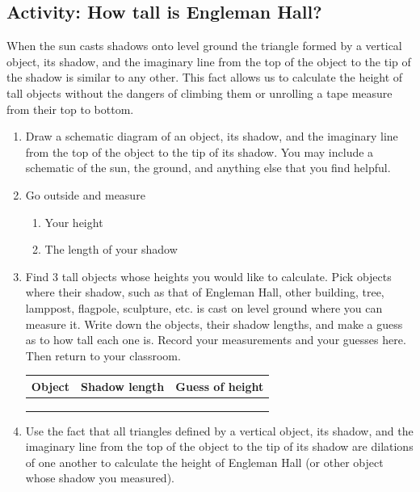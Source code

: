 \wbnewpage
\subsection{Activity: How tall is Engleman Hall?}
When the sun casts shadows onto level ground the triangle formed by a vertical object, its shadow, and the imaginary line from the top of the object to the tip of the shadow is similar to any other. This fact allows us to calculate the height of tall objects without the dangers of climbing them or unrolling a tape measure from their top to bottom.
\begin{enumerate}
    \item Draw a schematic diagram of an object, its shadow, and the imaginary line from the top of the object to the tip of its shadow. You may include a schematic of the sun, the ground, and anything else that you find helpful.\wbvfill\wbvfill
    \item Go outside and measure 
    \begin{enumerate}
        \item Your height\medskip
        \item The length of your shadow\medskip
    \end{enumerate}
    \item Find 3 tall objects whose heights you would like to calculate. Pick objects where their shadow, such as that of Engleman Hall, other building, tree, lamppost, flagpole, sculpture, etc. is cast on level ground where you can measure it. Write down the objects, their shadow lengths, and make a guess as to how tall each one is. Record your measurements and your guesses here. Then return to your classroom.
    \par\smallskip\noindent\setlength{\extrarowheight}{15pt}
    \begin{tabular}{|>{\raggedright}p{2in}|>{\raggedright}p{1.5in}|>{\raggedright}p{1.5in}|}
        \hline 
            Object & Shadow length & Guess of height\tabularnewline
        \hline 
            &  & \tabularnewline
        \hline 
            &  & \tabularnewline
        \hline 
            &  & \tabularnewline
        \hline 
    \end{tabular}
    \setlength{\extrarowheight}{0pt}
    \wbnewpage
    \item Use the fact that all triangles defined by a vertical object, its shadow, and the imaginary line from the top of the object to the tip of its shadow are dilations of one another to calculate the height of Engleman Hall (or other object whose shadow you measured).
\end{enumerate}

